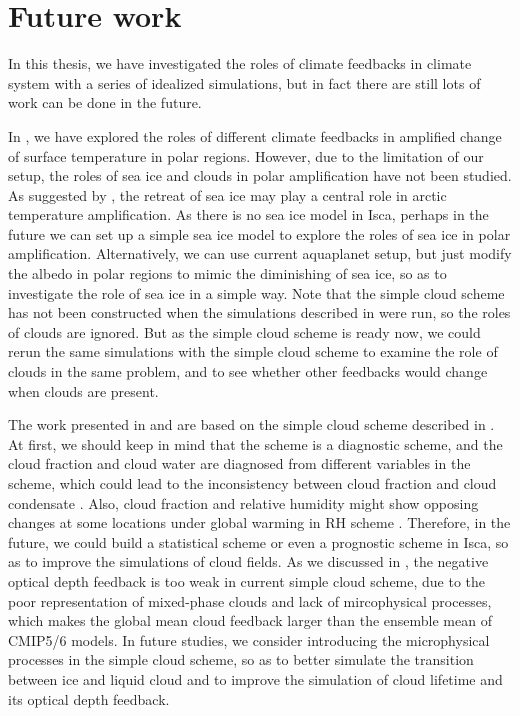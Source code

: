 \section{Future work}
In this thesis, we have investigated the 
roles of climate feedbacks in climate system with a series of idealized simulations, but in fact there are still lots of work can be done in the future.

In , we have explored the roles of different climate feedbacks in amplified change of surface temperature in polar regions. However, due to the limitation of our setup, the roles of sea ice and clouds in polar amplification have not been studied. As suggested by \cite{Screen2010}, the retreat of sea ice may play a central role in arctic temperature amplification. As there is no sea ice model in Isca, perhaps in the future we can set up a simple sea ice model to explore the roles of sea ice in polar amplification. Alternatively, we can use current aquaplanet setup, but just modify the albedo in polar regions to mimic the diminishing of sea ice, so as to investigate the role of sea ice in a simple way. Note that the simple cloud scheme has not been constructed when the simulations described in  were run, so the roles of clouds are ignored. But as the simple cloud scheme is ready now, we could rerun the same simulations with the simple cloud scheme to examine the role of clouds in the same problem, and to see whether other feedbacks would change when clouds are present.


The work presented in  and  are based on the simple cloud scheme described in \cite{Liu2021simcloud}. At first, we should keep in mind that the scheme is a diagnostic scheme, and the cloud fraction and cloud water are diagnosed from different variables in the scheme, which could lead to the inconsistency between cloud fraction and cloud condensate \citep[e.g.,][]{Gregory2002,Tompkins2005}. Also, cloud fraction and relative humidity might show opposing changes at some locations under global warming in RH scheme \citep{Ming2018}. Therefore, in the future, we could build a statistical scheme or even a prognostic scheme in Isca, so as to improve the simulations of cloud fields. As we discussed in , the negative optical depth feedback is too weak in current simple cloud scheme, due to the poor representation of mixed-phase clouds and lack of mircophysical processes, which makes the global mean cloud feedback larger than the ensemble mean of CMIP5/6 models. In future studies, we consider introducing the microphysical processes in the simple cloud scheme, so as to better simulate the transition between ice and liquid cloud and to improve the simulation of cloud lifetime and its optical depth feedback. 

